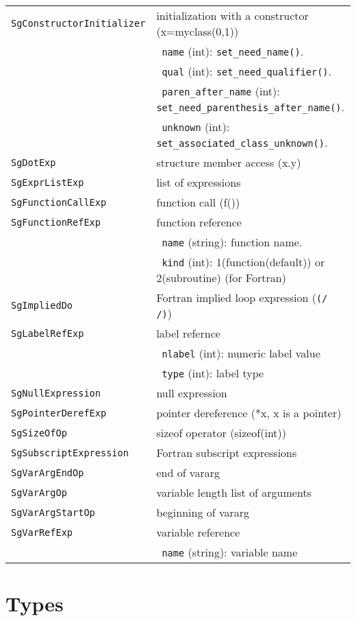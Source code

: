 \begin{longtable}[l]{l|p{10cm}}
 \texttt{SgConstructorInitializer} & initialization with a constructor (x=myclass(0,1))\\
 & ~\texttt{name} (int): \texttt{set\_need\_name()}. \\
 & ~\texttt{qual} (int): \texttt{set\_need\_qualifier()}.\\
 & ~\texttt{paren\_after\_name} (int): \texttt{set\_need\_parenthesis\_after\_name()}.\\
 & ~\texttt{unknown} (int): \texttt{set\_associated\_class\_unknown()}.\\
 \texttt{SgDotExp} & structure member access (x.y)\\
 \texttt{SgExprListExp} & list of expressions \\
 \texttt{SgFunctionCallExp} & function call  (f())\\
 \texttt{SgFunctionRefExp} & function reference\\
 & ~\texttt{name} (string): function name. \\
 & ~\texttt{kind} (int): 1(function(default)) or 2(subroutine) (for Fortran)\\
 \texttt{SgImpliedDo} & Fortran implied loop expression (\texttt{(/ /)})\\
 \texttt{SgLabelRefExp} & label refernce\\
 & ~\texttt{nlabel} (int): numeric label value\\
 & ~\texttt{type} (int): label type\\
 \texttt{SgNullExpression} & null expression \\
 \texttt{SgPointerDerefExp} & pointer dereference (*x, x is a pointer)\\
 \texttt{SgSizeOfOp} & sizeof operator (sizeof(int))\\
 \texttt{SgSubscriptExpression} & Fortran subscript expressions \\
 \texttt{SgVarArgEndOp} & end of vararg\\
 \texttt{SgVarArgOp} & variable length list of arguments \\
 \texttt{SgVarArgStartOp} & beginning of vararg\\
 \texttt{SgVarRefExp} & variable reference \\
 & ~\texttt{name} (string): variable name \\
\end{longtable}


\section{Types}

